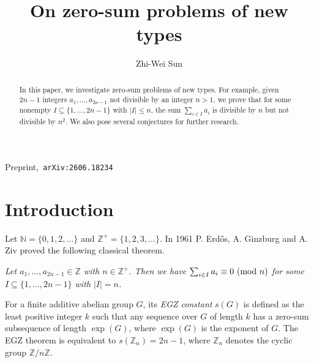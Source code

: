 \documentclass[11pt,reqno]{amsart}
\def\pmod #1{\ ({\rm{mod}}\ #1)}
\def\Z{\mathbb Z}
\def\N{\mathbb N}
\def\se {\subseteq}
\def\eq{\equiv}
\theoremstyle{plain}
\theoremstyle{definition}
\theoremstyle{remark}
\begin{document}
\hbox{Preprint, {\tt arXiv:2606.18234}}
\medskip

\title
[On zero-sum problems of new types]
{On zero-sum problems of new types}

\author
[Zhi-Wei Sun] {Zhi-Wei Sun}

\address{School of Mathematics, Nanjing
University, Nanjing 210093, People's Republic of China}


\begin{abstract} In this paper, we investigate zero-sum problems of new types. For example, given $2n-1$ integers $a_1,\ldots,a_{2n-1}$ not divisible by an integer $n>1$, we prove that for some nonempty $I\subseteq\{1,\ldots,2n-1\}$ with $|I|\leqslant n$, the sum $\sum_{i\in I}a_i$ is divisible by $n$ but not divisible by $n^2$. We also pose several conjectures for further research.
\end{abstract}
\maketitle

\section{Introduction}
\setcounter{lemma}{0}
\setcounter{theorem}{0}
\setcounter{corollary}{0}
\setcounter{remark}{0}
\setcounter{definition}{0}
\setcounter{equation}{0}

Let $\N=\{0,1,2,\ldots\}$ and $\Z^+=\{1,2,3,\ldots\}$.
In 1961 P. Erd\H os, A. Ginzburg and A. Ziv \cite{EGZ} proved the following classical
theorem.

\medskip
{} {\it Let $a_1,\ldots,a_{2n-1}\in\Z$ with $n\in\Z^+$.
Then we have $\sum_{i\in I}a_i\eq0\pmod n$ for some $I\se\{1,\ldots,2n-1\}$ with $|I|=n$.}
\medskip

For a finite additive abelian group $G$, its {\it EGZ constant} $s(G)$
is defined as the least positive integer $k$ such that any sequence over $G$ of length $k$
has a zero-sum subsequence of length $\exp(G)$, where $\exp(G)$ is the exponent of $G$.
The EGZ theorem is equivalent to $s(\Z_n)=2n-1$, where $\Z_n$ denotes the cyclic group $\Z/n\Z$.
\end{document}
